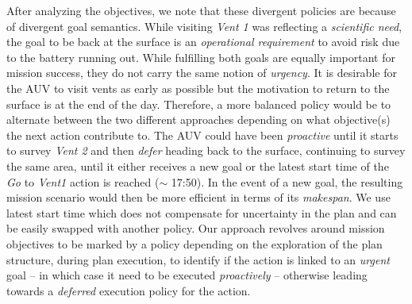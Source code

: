 After analyzing the objectives, we note that these divergent policies are
because of divergent goal semantics. While visiting {\em Vent 1} was
reflecting a \emph{scientific need}, the goal to be back at the
surface is an \emph{operational requirement} to avoid risk
due to the battery running out. While fulfilling both goals are
equally important for mission success, they do not carry the same
notion of {\em urgency}. It is desirable for the AUV to visit vents as
early as possible but the motivation to return to the
surface is at the end of the day. Therefore, a more balanced policy
would be to alternate between the two different approaches depending
on what objective(s) the next action contribute to. The AUV could have
been {\em proactive} until it starts to survey {\em Vent 2} and then
{\em defer} heading back to the surface, continuing to survey the same
area, until it either receives a new goal or the latest start time of
the {\em Go} to \emph{Vent1} action is reached ($\sim$ 17:50). In the
event of a new goal,
the resulting mission scenario would then be more efficient in terms
of its \emph{makespan}. We use latest start time which does not compensate
for uncertainty in the plan and can be easily swapped with another policy.
Our approach revolves around mission
objectives to be marked by a policy depending on the 
exploration of the plan structure, during plan execution, to identify if
the action is linked to an {\em urgent} goal -- in which case it need
to be executed {\em proactively} -- otherwise leading towards a {\em
  deferred} execution policy for the action.
 


